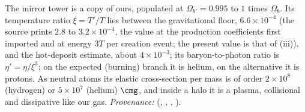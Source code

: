 The mirror tower is a copy of ours, populated at $\Omega_{b'} = 0.995$ to $1$ times $\Omega_{b}$. Its temperature ratio $\xi = T'/T$ lies between the gravitational floor, $6.6 \times 10^{-4}$ (the source prints $2.8$ to $3.2 \times 10^{-4}$, the value at the production coefficients first imported and at energy $3T$ per creation event; the present value is that of (iii)), and the hot-deposit estimate, about $4 \times 10^{-3}$; its baryon-to-photon ratio is $\eta' = \eta/\xi^{3}$; on the expected (burning) branch it is helium, on the alternative it is protons. As neutral atoms its elastic cross-section per mass is of order $2 \times 10^{8}$ (hydrogen) or $5 \times 10^{7}$ (helium) $\cmg$, and inside a halo it is a plasma, collisional and dissipative like our gas. \emph{Provenance:} \cite[Thm.~4.3, Props.~4.6 and 4.7, Prop.~6.2]{ButlerT14} (, , , ).
